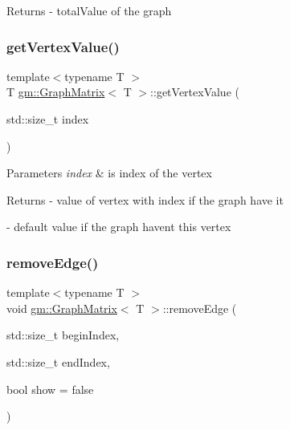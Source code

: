 \begin{DoxyReturn}{Returns}
-\/ \textquotesingle{}total\+Value\textquotesingle{} of the graph 
\end{DoxyReturn}
\mbox{\label{classgm_1_1_graph_matrix_adacccfacb1c46e0fa0ca173846f48a11}} 
\subsubsection{\texorpdfstring{get\+Vertex\+Value()}{getVertexValue()}}
{\footnotesize\ttfamily template$<$typename T $>$ \\
T \mbox{\hyperlink{classgm_1_1_graph_matrix}{gm\+::\+Graph\+Matrix}}$<$ T $>$\+::get\+Vertex\+Value (\begin{DoxyParamCaption}\item[{std\+::size\+\_\+t}]{index }\end{DoxyParamCaption})}


\begin{DoxyParams}{Parameters}
{\em index} & is index of the vertex \\
\hline
\end{DoxyParams}
\begin{DoxyReturn}{Returns}
-\/ value of vertex with \textquotesingle{}index\textquotesingle{} if the graph have it 

-\/ default value if the graph haven\textquotesingle{}t this vertex 
\end{DoxyReturn}
\mbox{\label{classgm_1_1_graph_matrix_aaee8cb1c4d2bab6fcba5f3fc64852bfd}} 
\subsubsection{\texorpdfstring{remove\+Edge()}{removeEdge()}}
{\footnotesize\ttfamily template$<$typename T $>$ \\
void \mbox{\hyperlink{classgm_1_1_graph_matrix}{gm\+::\+Graph\+Matrix}}$<$ T $>$\+::remove\+Edge (\begin{DoxyParamCaption}\item[{std\+::size\+\_\+t}]{begin\+Index,  }\item[{std\+::size\+\_\+t}]{end\+Index,  }\item[{bool}]{show = {\ttfamily false} }\end{DoxyParamCaption})}



